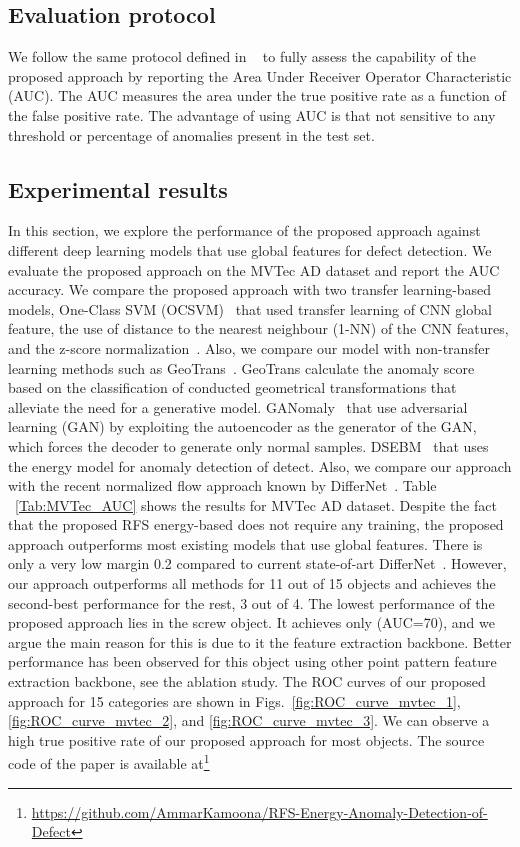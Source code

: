\documentclass[journal]{IEEEtran}
\begin{document}
\subsection{Evaluation protocol}
We follow the same protocol defined in ~\cite{rudolph2021same,ganomaly,rippel2021modeling} to fully assess the capability of the proposed approach by reporting the Area Under Receiver Operator Characteristic (AUC). The AUC measures the area under the true positive rate as a function of the false positive rate. The advantage of using AUC is that not sensitive to any threshold or percentage of anomalies present in the test set.
\subsection{Experimental results}
In this section, we explore the performance of the proposed approach against different deep learning models that use global features for defect detection. We evaluate the proposed approach on the MVTec AD dataset and report the AUC accuracy. We compare the proposed approach with two transfer learning-based models, One-Class SVM (OCSVM)~\cite{andrews} that used transfer learning of CNN global feature, the use of distance to the nearest neighbour (1-NN) of the CNN features, and the z-score normalization~\cite{nazare}. Also, we compare our model with non-transfer learning methods such as GeoTrans~\cite{geotrans}. GeoTrans calculate the anomaly score based on the classification of conducted geometrical transformations that alleviate the need for a generative model. GANomaly~\cite{akcay2018ganomaly} that use adversarial learning (GAN) by exploiting the autoencoder as the generator of the GAN, which forces the decoder to generate only normal samples. DSEBM~\cite{dsebm} that uses the energy model for anomaly detection of detect. Also, we compare our approach with the recent normalized flow approach known by DifferNet~\cite{rudolph2021same}. Table ~\ref{Tab:MVTec_AUC} shows the results for MVTec AD dataset. Despite the fact that the proposed RFS energy-based does not require any training, the proposed approach outperforms most existing models that use global features. There is only a very low margin 0.2 compared to current state-of-art DifferNet~\cite{rudolph2021same}. However, our approach outperforms all methods for 11 out of 15 objects and achieves the second-best performance for the rest, 3 out of 4. The lowest performance of the proposed approach lies in the screw object. It achieves only (AUC=70), and we argue the main reason for this is due to it the feature extraction backbone. Better performance has been observed for this object using other point pattern feature extraction backbone, see the ablation study. The ROC curves of our proposed approach for 15 categories are shown in Figs.~\ref{fig:ROC_curve_mvtec_1},\ref{fig:ROC_curve_mvtec_2}, and \ref{fig:ROC_curve_mvtec_3}. We can observe a high true positive rate of our proposed approach for most objects. The source code of the paper is available at\footnote{ \url{https://github.com/AmmarKamoona/RFS-Energy-Anomaly-Detection-of-Defect}}
\end{document}
